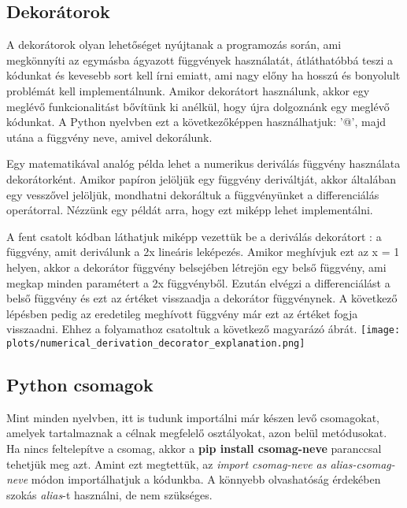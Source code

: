 \documentclass{article}
\theoremstyle{definition}
\theoremstyle{theorem}
\begin{document}
\subsection{Dekorátorok}
A dekorátorok olyan lehetőséget nyújtanak a programozás során, ami megkönnyíti az egymásba ágyazott függvények használatát, átláthatóbbá teszi a kódunkat és kevesebb sort kell írni emiatt, ami nagy előny ha hosszú és bonyolult problémát kell implementálnunk. Amikor dekorátort használunk, akkor egy meglévő funkcionalitást bővítünk ki anélkül, hogy újra dolgoznánk egy meglévő kódunkat. A Python nyelvben ezt a következőképpen használhatjuk: '@', majd utána a függvény neve, amivel dekorálunk.

Egy matematikával analóg példa lehet a numerikus deriválás függvény használata dekorátorként. Amikor papíron jelöljük egy függvény deriváltját, akkor általában egy vesszővel jelöljük, mondhatni dekoráltuk a függvényünket a differenciálás operátorral. Nézzünk egy példát arra, hogy ezt miképp lehet implementálni.

A fent csatolt kódban láthatjuk miképp vezettük be a deriválás dekorátort : a függvény, amit deriválunk a 2x lineáris leképezés. Amikor meghívjuk ezt az x = 1 helyen, akkor a dekorátor függvény belsejében létrejön egy belső függvény, ami megkap minden paramétert a 2x függvényből. Ezután elvégzi a differenciálást a belső függvény és ezt az értéket visszaadja a dekorátor függvénynek. A következő lépésben pedig az eredetileg meghívott függvény már ezt az értéket fogja visszaadni. Ehhez a folyamathoz csatoltuk a következő magyarázó ábrát. \newline
\texttt{[image: plots/numerical\_derivation\_decorator\_explanation.png]}
\subsection{Python csomagok}
Mint minden nyelvben, itt is tudunk importálni már készen levő csomagokat, amelyek tartalmaznak a célnak megfelelő osztályokat, azon belül metódusokat. Ha nincs feltelepítve a csomag, akkor a \textbf{pip install csomag-neve} paranccsal tehetjük meg azt.
Amint ezt megtettük, az \textit{import csomag-neve as alias-csomag-neve} módon importálhatjuk a kódunkba. A könnyebb olvashatóság érdekében szokás \textit{alias}-t használni, de nem szükséges.


\end{document}
